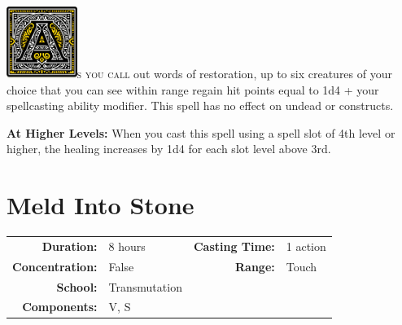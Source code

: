 \documentclass[12pt,showtrims]{memoir}
\begin{document}
\vspace{1\baselineskip}\noindent
\lettrine[lines=4]{\includegraphics[height=66pt]{initials/A.png}}{s you call} out words of restoration, up to six creatures of your choice that you can see within range regain hit points equal to 1d4 + your spellcasting ability modifier. This spell has no effect on undead or constructs.

\vspace{8pt} \noindent\textbf{At Higher Levels:} When you cast this spell using a spell slot of 4th level or higher, the healing increases by 1d4 for each slot level above 3rd.
\newpage
\section*{Meld Into Stone}

{
\small\centering\vspace{-6pt}
\begin{tabular}{rlrl}
\toprule

\textbf{Duration:} & 8 hours &
\textbf{Casting Time:} & 1 action \\
\textbf{Concentration:} & False &
\textbf{Range:} & Touch \\
\textbf{School:} & Transmutation \\
\textbf{Components:} & \multicolumn{3}{p{0.7\textwidth}}{V, S}\\

\bottomrule
\end{tabular}
}
\end{document}
